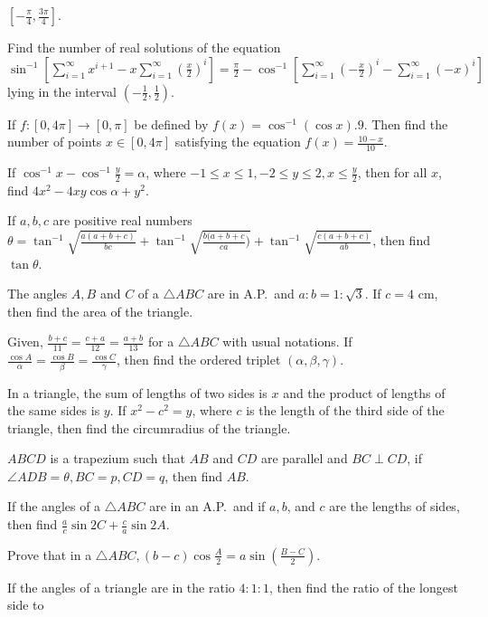  $\left[-\frac{\pi}{4}, \frac{3\pi}{4}\right]$.
\item Find the number of real solutions of the equation $\sin^{-1}\left[\displaystyle\sum_{i = 1}^\infty
  x^{i + 1} - x\sum_{i = 1}^\infty\left(\frac{x}{2}\right)^i\right] = \frac{\pi}{2} - \cos^{-1}\left[\sum_{i
  = 1}^\infty\left(-\frac{x}{2}\right)^i - \sum_{i = 1}^\infty(-x)^i\right]$ lying in the interval
  $\left(-\frac{1}{2}, \frac{1}{2}\right)$.
\item If $f: [0, 4\pi]\rightarrow [0, \pi]$ be defined by $f(x) = \cos^{-1}(\cos x).9$. Then find the number
  of points $x\in[0, 4\pi]$ satisfying the equation $f(x) = \frac{10 - x}{10}$.
\item If $\cos^{-1}x - \cos^{-1}\frac{y}{2} = \alpha$, where $-1\le x\le 1, -2\le y\le 2, x\le\frac{y}{2}$,
  then for all $x$, find $4x^2 - 4xy\cos\alpha + y^2$.
\item If $a, b, c$ are positive real numbers $\theta = \tan^{-1}\sqrt{\frac{a(a + b + c)}{bc}}
  + \tan^{-1}\sqrt{\frac{b(a + b + c}{ca})} + \tan^{-1}\sqrt{\frac{c(a + b + c)}{ab}}$, then find
  $\tan\theta$.
\item The angles $A, B$ and $C$ of a $\triangle ABC$ are in A.P.\ and $a:b = 1:\sqrt{3}$. If $c = 4$ cm,
  then find the area of the triangle.
\item Given, $\frac{b + c}{11} = \frac{c + a}{12} = \frac{a + b}{13}$ for a $\triangle ABC$ with usual
  notations. If $\frac{\cos A}{\alpha} = \frac{\cos B}{\beta} = \frac{\cos C}{\gamma}$, then find the
  ordered triplet $(\alpha, \beta, \gamma)$.
\item In a triangle, the sum of lengths of two sides is $x$ and the product of lengths of the same sides is
  $y$. If $x^2 - c^2 = y$, where $c$ is the length of the third side of the triangle, then find the
  circumradius of the triangle.
\item $ABCD$ is a trapezium such that $AB$ and $CD$ are parallel and $BC\perp CD$, if $\angle ADB = \theta,
  BC = p, CD = q$, then find $AB$.
\item If the angles of a $\triangle ABC$ are in an A.P.\ and if $a, b$, and $c$ are the lengths of sides,
  then find $\frac{a}{c}\sin2C + \frac{c}{a}\sin2A$.
\item Prove that in a $\triangle ABC, (b - c)\cos\frac{A}{2} = a\sin\left(\frac{B - C}{2}\right)$.
\item If the angles of a triangle are in the ratio $4:1:1$, then find the ratio of the longest side to
